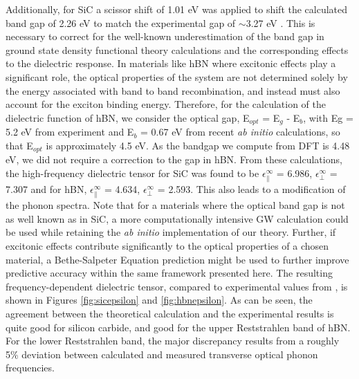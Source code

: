 \documentclass[aps,prb,twocolumn,
	groupedaddress,superscriptaddress,
	amsfonts,amssymb,amsmath,floatfix,
	citeautoscript]{revtex4-1}
\begin{document}
Additionally, for SiC a scissor shift of 1.01 eV was applied to shift the calculated band gap of 2.26 eV to match the experimental gap of $\sim$3.27 eV \cite{band_gap_expt1,band_gap_expt2}. This is necessary to correct for the well-known underestimation of the band gap in ground state density functional theory calculations and the corresponding effects to the dielectric response. In materials like hBN where excitonic effects play a significant role, the optical properties of the system are not determined solely by the energy associated with band to band recombination, and instead must also account for the exciton binding energy\cite{robert2016excitonic}. 
Therefore, for the calculation of the dielectric function of hBN, we consider the optical gap, E$_{opt}$ = E$_g$ - E$_{b}$, with Eg = 5.2 eV from experiment\cite{levinshtein2001properties} and E$_{b}$ = 0.67 eV from recent \emph{ab initio} calculations\cite{attaccalite2018two}, so that E$_{opt}$ is approximately 4.5 eV. As the bandgap we compute from DFT is 4.48 eV, we did not require a correction to the gap in hBN.
From these calculations, the high-frequency dielectric tensor for SiC was found to be $\epsilon^{\infty}_{\parallel}$ = 6.986, $\epsilon^{\infty}_{\perp}$ = 7.307 and for hBN, $\epsilon^{\infty}_{\parallel}$ = 4.634, $\epsilon^{\infty}_{\perp}$ = 2.593.  This also leads to a modification of the phonon spectra.
Note that for a materials where the optical band gap is not as well known as in SiC, a more computationally intensive GW calculation could be used while retaining the \emph{ab initio} implementation of our theory. Further, if excitonic effects contribute significantly to the optical properties of a chosen material, a Bethe-Salpeter Equation prediction might be used to further improve predictive accuracy within the same framework presented here.
The resulting frequency-dependent dielectric tensor, compared to experimental values from \cite{tiwald1999carrier,caldwell2014sub}, is shown in Figures \ref{fig:sicepsilon} and \ref{fig:hbnepsilon}. As can be seen, the agreement between the theoretical calculation and the experimental results is quite good for silicon carbide, and good for the upper Reststrahlen band of hBN. For the lower Reststrahlen band, the major discrepancy results from a roughly 5\% deviation between calculated and measured transverse optical phonon frequencies. 
\end{document}

